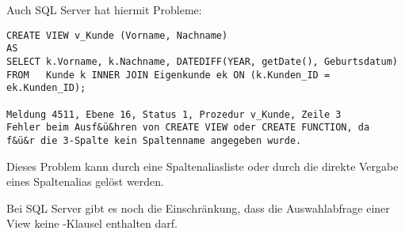 \clearpage
        Auch SQL Server hat hiermit Probleme:
        \begin{lstlisting}[language=ms_sql,caption={Eine View mit einer berechneten Spalte in SQL Server},label=sql08_34]
CREATE VIEW v_Kunde (Vorname, Nachname)
AS
SELECT k.Vorname, k.Nachname, DATEDIFF(YEAR, getDate(), Geburtsdatum)
FROM   Kunde k INNER JOIN Eigenkunde ek ON (k.Kunden_ID = ek.Kunden_ID);

Meldung 4511, Ebene 16, Status 1, Prozedur v_Kunde, Zeile 3
Fehler beim Ausf&ü&hren von CREATE VIEW oder CREATE FUNCTION, da
f&ü&r die 3-Spalte kein Spaltenname angegeben wurde.
        \end{lstlisting}
        Dieses Problem kann durch eine Spaltenaliasliste oder durch die direkte Vergabe eines Spaltenalias gelöst werden.

        \begin{merke}
          Bei SQL Server gibt es noch die Einschränkung, dass die Auswahlabfrage einer View keine \ORDERBY-Klausel enthalten darf.
        \end{merke}
		\clearpage
